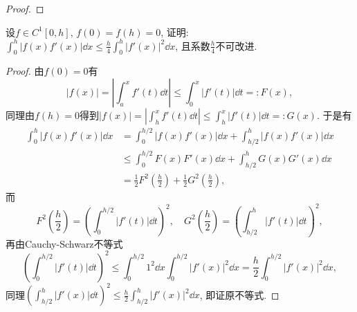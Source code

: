 \begin{quizb}
\begin{proof}
\end{proof}
\woe 设\(f\in C^1[0,h],\,f(0)=f(h)=0\), 证明: \(\int_{0}^{h}\left|f(x)f'(x)\right|\dd x\leqslant\frac{h}{4}\int_{0}^{h}\left|f'(x)\right|^2\dd x\), 且系数\(\frac{h}{4}\)不可改进.
\begin{proof}
由\(f(0)=0\)有\[\left|f(x)\right|=\left|\int_{a}^{x}f'(t)\dd t\right|\leqslant\int_{0}^{x}\left|f'(t)\right|\dd t=:F(x),\]同理由\(f(h)=0\)得到\(\left|f(x)\right|=\left|\int_{h}^{x}f'(t)\dd t\right|\leqslant\int_{h}^{x}\left|f'(t)\right|\dd t=:G(x)\). 于是有\[\begin{split}
\int_{0}^{h}\left|f(x)f'(x)\right|\dd x&=\int_{0}^{h/2}\left|f(x)f'(x)\right|\dd x+\int_{h/2}^{h}\left|f(x)f'(x)\right|\dd x\\&\leqslant\int_{0}^{h/2}F(x)F'(x)\dd x+\int_{h/2}^{h}G(x)G'(x)\dd x\\&=\frac{1}{2}F^2\left(\frac{h}{2}\right)+\frac{1}{2}G^2\left(\frac{h}{2}\right),
\end{split}\]而\[F^2\left(\frac{h}{2}\right)=\left(\int_{0}^{h/2}\left|f'(t)\right|\dd t\right)^2,\quad G^2\left(\frac{h}{2}\right)=\left(\int_{h/2}^{h}\left|f'(t)\right|\dd t\right)^2,\]再由Cauchy-Schwarz不等式\[\left(\int_{0}^{h/2}\left|f'(t)\right|\dd t\right)^2\leqslant\int_{0}^{h/2}1^2\dd x\int_{0}^{h/2}\left|f'(x)\right|^2\dd x=\frac{h}{2}\int_{0}^{h/2}\left|f'(x)\right|^2\dd x,\]同理\(\left(\int_{h/2}^{h}\left|f'(x)\right|\dd t\right)^2\leqslant\frac{h}{2}\int_{h/2}^{h}\left|f'(x)\right|^2\dd x\), 即证原不等式.


\end{proof}
\end{quizb}
